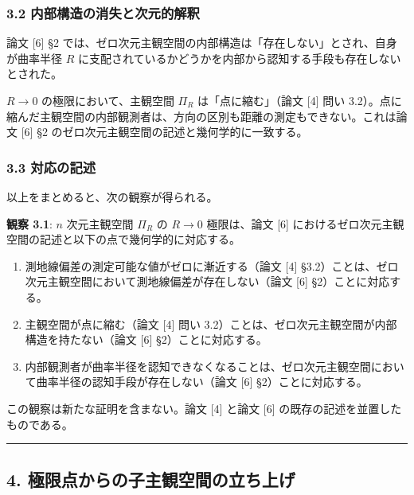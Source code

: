 \documentclass[a4paper,11pt]{ltjsarticle}
\theoremstyle{definition}
\providecommand{\tightlist}{\setlength{\itemsep}{0pt}\setlength{\parskip}{0pt}}
\begin{document}
\subsubsection{3.2
内部構造の消失と次元的解釈}\label{ux5185ux90e8ux69cbux9020ux306eux6d88ux5931ux3068ux6b21ux5143ux7684ux89e3ux91c8}

論文 {[}6{]} §2
では、ゼロ次元主観空間の内部構造は「存在しない」とされ、自身が曲率半径
\(R\)
に支配されているかどうかを内部から認知する手段も存在しないとされた。

\(R \to 0\) の極限において、主観空間 \(\Pi_R\) は「点に縮む」（論文
{[}4{]} 問い
3.2）。点に縮んだ主観空間の内部観測者は、方向の区別も距離の測定もできない。これは論文
{[}6{]} §2 のゼロ次元主観空間の記述と幾何学的に一致する。

\subsubsection{3.3 対応の記述}\label{ux5bfeux5fdcux306eux8a18ux8ff0}

以上をまとめると、次の観察が得られる。

\textbf{観察 3.1}: \(n\) 次元主観空間 \(\Pi_R\) の \(R \to 0\)
極限は、論文 {[}6{]}
におけるゼロ次元主観空間の記述と以下の点で幾何学的に対応する。

\begin{enumerate}
\def\labelenumi{\arabic{enumi}.}
\tightlist
\item
  測地線偏差の測定可能な値がゼロに漸近する（論文 {[}4{]}
  §3.2）ことは、ゼロ次元主観空間において測地線偏差が存在しない（論文
  {[}6{]} §2）ことに対応する。
\item
  主観空間が点に縮む（論文 {[}4{]} 問い
  3.2）ことは、ゼロ次元主観空間が内部構造を持たない（論文 {[}6{]}
  §2）ことに対応する。
\item
  内部観測者が曲率半径を認知できなくなることは、ゼロ次元主観空間において曲率半径の認知手段が存在しない（論文
  {[}6{]} §2）ことに対応する。
\end{enumerate}

この観察は新たな証明を含まない。論文 {[}4{]} と論文 {[}6{]}
の既存の記述を並置したものである。

\begin{center}\rule{0.5\linewidth}{0.5pt}\end{center}

\subsection{4.
極限点からの子主観空間の立ち上げ}\label{ux6975ux9650ux70b9ux304bux3089ux306eux5b50ux4e3bux89b3ux7a7aux9593ux306eux7acbux3061ux4e0aux3052}
\end{document}
